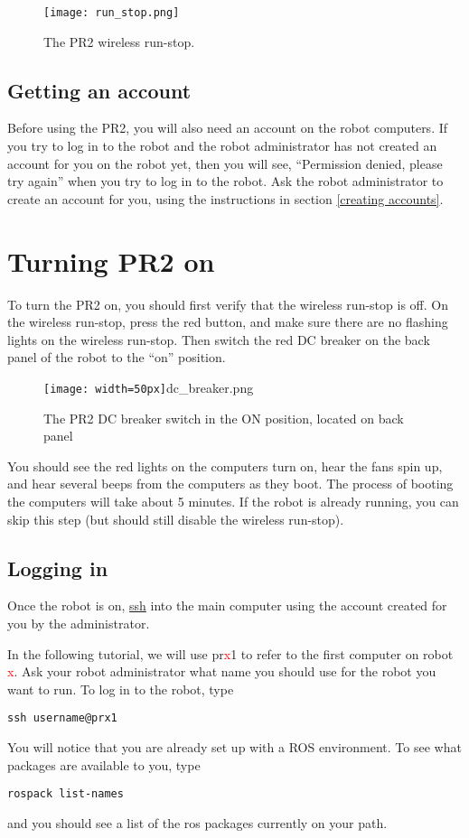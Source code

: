 \begin{figure}[h]
\centering
\texttt{[image: run\_stop.png]}
\caption{The PR2 wireless run-stop.}
\label{fig:runstop}
\end{figure}

\subsection{Getting an account}
Before using the PR2, you will also need an account on the robot computers.  If you try to log in to the robot and the robot administrator has not created an account for you on the robot yet, then you will see, ``Permission denied, please try again'' when you try to log in to the robot. Ask the robot administrator to create an account for you, using the instructions in section \ref{creating accounts}.
\section{Turning PR2 on}
To turn the PR2 on, you should first verify that the wireless run-stop is off. On the wireless run-stop, press the red button, and make sure there are no flashing lights on the wireless run-stop. Then switch the red DC breaker on the back panel of the robot to the ``on'' position.  

\begin{figure}[h]
\centering
\texttt{[image: width=50px]}{dc_breaker.png}
\caption{The PR2 DC breaker switch in the ON position, located on back panel}
\label{fig:dc_breaker}
\end{figure}

You should see the red lights on the computers turn on, hear the fans spin up, and hear several beeps from the computers as they boot.  The process of booting the computers will take about 5 minutes.  If the robot is already running, you can skip this step (but should still disable the wireless run-stop).
\subsection{Logging in}
Once the robot is on, \href{http://unixhelp.ed.ac.uk/CGI/man-cgi?ssh}{ssh} into the main computer using the account created for you by the administrator. 

In the following tutorial, we will use pr\textcolor{red}{x}1 to refer to the first computer on robot \textcolor{red}{x}.  Ask your robot  administrator what name you should use for the robot you want to run. To log in to the robot, type
\begin{verbatim}
ssh username@prx1
\end{verbatim}
You will notice that you are already set up with a ROS environment.  To see what packages are available to you, type
\begin{verbatim}
rospack list-names
\end{verbatim}
and you should see a list of the ros packages currently on your path.

